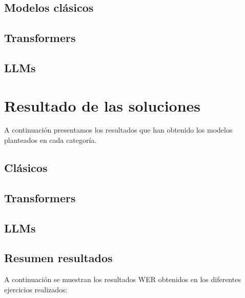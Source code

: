 \documentclass[11pt,spanish,listoffigures,listoftables]{tfgetsinf}
\begin{document}
\section{Modelos clásicos}

\section{Transformers}

\section{LLMs}


\chapter{Resultado de las soluciones}
A continuación presentamos los resultados que han obtenido los modelos planteados en cada categoría.

\section{Clásicos}

\section{Transformers}


\section{LLMs}


\section{Resumen resultados}
A continuación se muestran los resultados WER obtenidos en los diferentes ejercicios realizados:
\end{document}
